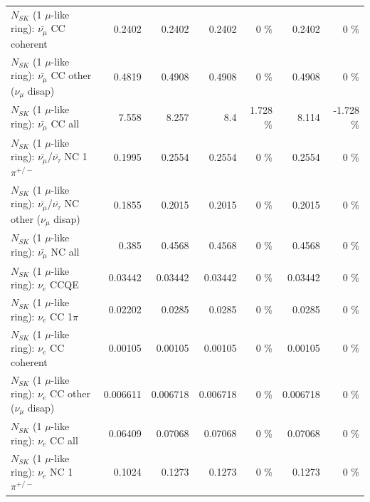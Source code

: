 \begin{table}
\begin{tabular}{| l | r | r | r  r | r  r |}
                       $N_{SK}$ (1 $\mu$-like ring): $\bar{\nu_\mu}$ CC coherent &          0.2402 &          0.2402 &          0.2402 &        0 \%  &          0.2402 &        0 \%  \\ 
        $N_{SK}$ (1 $\mu$-like ring): $\bar{\nu_\mu}$ CC other ($\nu_\mu$ disap) &          0.4819 &          0.4908 &          0.4908 &        0 \%  &          0.4908 &        0 \%  \\ 
                          $N_{SK}$ (1 $\mu$-like ring): $\bar{\nu_{\mu}}$ CC all &           7.558 &           8.257 &             8.4 &    1.728 \%  &           8.114 &   -1.728 \%  \\ 
\hline
  $N_{SK}$ (1 $\mu$-like ring): $\bar{\nu_\mu}$/$\bar{\nu_\tau}$ NC 1$\pi^{+/-}$ &          0.1995 &          0.2554 &          0.2554 &        0 \%  &          0.2554 &        0 \%  \\ 
$N_{SK}$ (1 $\mu$-like ring): $\bar{\nu_\mu}$/$\bar{\nu_\tau}$ NC other ($\nu_\mu$ disap) &          0.1855 &          0.2015 &          0.2015 &        0 \%  &          0.2015 &        0 \%  \\ 
                          $N_{SK}$ (1 $\mu$-like ring): $\bar{\nu_{\mu}}$ NC all &           0.385 &          0.4568 &          0.4568 &        0 \%  &          0.4568 &        0 \%  \\ 
\hline
\hline
\hline
                                      $N_{SK}$ (1 $\mu$-like ring): $\nu_e$ CCQE &         0.03442 &         0.03442 &         0.03442 &        0 \%  &         0.03442 &        0 \%  \\ 
                                 $N_{SK}$ (1 $\mu$-like ring): $\nu_e$ CC 1$\pi$ &         0.02202 &          0.0285 &          0.0285 &        0 \%  &          0.0285 &        0 \%  \\ 
                               $N_{SK}$ (1 $\mu$-like ring): $\nu_e$ CC coherent &         0.00105 &         0.00105 &         0.00105 &        0 \%  &         0.00105 &        0 \%  \\ 
                $N_{SK}$ (1 $\mu$-like ring): $\nu_e$ CC other ($\nu_\mu$ disap) &        0.006611 &        0.006718 &        0.006718 &        0 \%  &        0.006718 &        0 \%  \\ 
                                  $N_{SK}$ (1 $\mu$-like ring): $\nu_{e}$ CC all &         0.06409 &         0.07068 &         0.07068 &        0 \%  &         0.07068 &        0 \%  \\ 
\hline
                           $N_{SK}$ (1 $\mu$-like ring): $\nu_e$ NC 1$\pi^{+/-}$ &          0.1024 &          0.1273 &          0.1273 &        0 \%  &          0.1273 &        0 \%  \\ 

\end{tabular}
\end{table}
